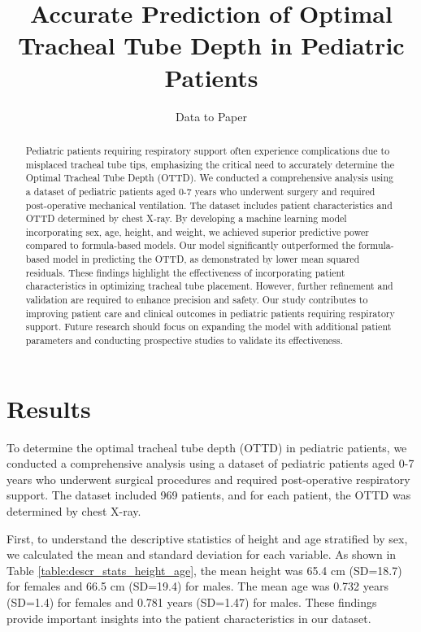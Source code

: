 \documentclass[11pt]{article}
\title{Accurate Prediction of Optimal Tracheal Tube Depth in Pediatric Patients}
\author{Data to Paper}
\begin{document}
\maketitle
\begin{abstract}
Pediatric patients requiring respiratory support often experience complications due to misplaced tracheal tube tips, emphasizing the critical need to accurately determine the Optimal Tracheal Tube Depth (OTTD). We conducted a comprehensive analysis using a dataset of pediatric patients aged 0-7 years who underwent surgery and required post-operative mechanical ventilation. The dataset includes patient characteristics and OTTD determined by chest X-ray. By developing a machine learning model incorporating sex, age, height, and weight, we achieved superior predictive power compared to formula-based models. Our model significantly outperformed the formula-based model in predicting the OTTD, as demonstrated by lower mean squared residuals. These findings highlight the effectiveness of incorporating patient characteristics in optimizing tracheal tube placement. However, further refinement and validation are required to enhance precision and safety. Our study contributes to improving patient care and clinical outcomes in pediatric patients requiring respiratory support. Future research should focus on expanding the model with additional patient parameters and conducting prospective studies to validate its effectiveness.
\end{abstract}
\section*{Results}

To determine the optimal tracheal tube depth (OTTD) in pediatric patients, we conducted a comprehensive analysis using a dataset of pediatric patients aged 0-7 years who underwent surgical procedures and required post-operative respiratory support. The dataset included 969 patients, and for each patient, the OTTD was determined by chest X-ray. 

First, to understand the descriptive statistics of height and age stratified by sex, we calculated the mean and standard deviation for each variable. As shown in Table {}\ref{table:descr_stats_height_age}, the mean height was 65.4 cm (SD=18.7) for females and 66.5 cm (SD=19.4) for males. The mean age was 0.732 years (SD=1.4) for females and 0.781 years (SD=1.47) for males. These findings provide important insights into the patient characteristics in our dataset.
\end{document}
